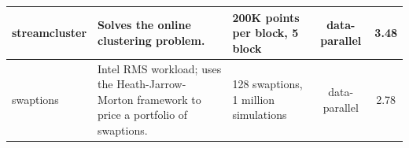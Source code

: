 \begin{table}[!t]
\begin{tabular}{|p{2cm}|p{4.7cm}|p{2.5cm}|c|c|}
	streamcluster & Solves the online clustering problem. & 200K points per block, 5 block & 
data-parallel & 3.48 \\ \hline
	swaptions & Intel RMS workload; uses the Heath-Jarrow-Morton framework to price a portfolio of swaptions. & 128 swaptions, 1 million  simulations & data-parallel & 2.78 \\ \hline
	\end{tabular}
	\label{tab:parsec}
\end{table}


% 




